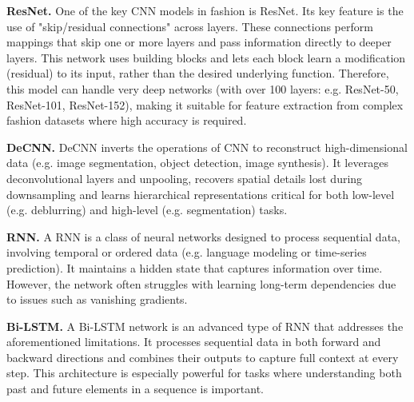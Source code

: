 \vspace{0.5cm}

\textbf{\ac{ResNet}.}
One of the key \acs{CNN} models in fashion is \acs{ResNet}. Its key feature is the use of "skip/residual connections" across layers. These connections perform mappings that skip one or more layers and pass information directly to deeper layers. This network uses building blocks and lets each block learn a modification (residual) to its input, rather than the desired underlying function. Therefore, this model can handle very deep networks (with over 100 layers: e.g. ResNet-50, ResNet-101, ResNet-152), making it suitable for feature extraction from complex fashion datasets where high accuracy is required. \cite[cf.]{he_deep_2015}

\vspace{0.5cm}

\textbf{\ac{DeCNN}.}
\acs{DeCNN} inverts the operations of \acs{CNN} to reconstruct high-dimensional data (e.g. image segmentation, object detection, image synthesis). It leverages deconvolutional layers and unpooling, recovers spatial details lost during downsampling and learns hierarchical representations critical for both low-level (e.g. deblurring) and high-level (e.g. segmentation) tasks. \cite[cf.]{zeiler_deconvolutional_2010}

\vspace{0.5cm}

\textbf{\ac{RNN}.}
A \acs{RNN} is a class of neural networks designed to process sequential data, involving temporal or ordered data (e.g. language modeling or time-series prediction). It maintains a hidden state that captures information over time. However, the network often struggles with learning long-term dependencies due to issues such as vanishing gradients. \cite[cf.]{sherstinsky_fundamentals_2018}

\vspace{0.5cm}

\textbf{\ac{Bi-LSTM}.}
A \acs{Bi-LSTM} network is an advanced type of \acs{RNN} that addresses the aforementioned limitations. It processes sequential data in both forward and backward directions and combines their outputs to capture full context at every step. This architecture is especially powerful for tasks where understanding both past and future elements in a sequence is important. \cite[cf.]{huang_bidirectional_2015}

\vspace{0.5cm}

